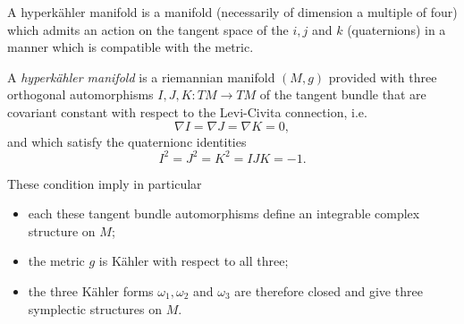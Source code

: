 \documentclass{worksheetclass}
\begin{document}
        A hyperkähler manifold is a manifold (necessarily of dimension a multiple of four) which admits an action on the tangent space of the $i,j$ and $k$ (quaternions) in a manner which is compatible with the metric.
        \begin{defn}
            A \emph{hyperkähler manifold} is a riemannian manifold $(M,g)$ provided with three orthogonal automorphisms $I,J,K:TM\to TM$ of the tangent bundle that are covariant constant with respect to the Levi-Civita connection, i.e.
            \begin{equation*}
                \nabla I=\nabla J=\nabla K = 0,
            \end{equation*}
            and which satisfy the quaternionc identities
            \begin{equation*}
                I^2=J^2=K^2=IJK = -1.
            \end{equation*}
        \end{defn}
        These condition imply in particular
        \begin{itemize}
            \item each these tangent bundle automorphisms define an integrable complex structure on $M$;
            \item the metric $g$ is Kähler with respect to all three;
            \item the three Kähler forms $\omega_1,\omega_2$ and $\omega_3$ are therefore closed and give three symplectic structures on $M$.
        \end{itemize}
\end{document}
